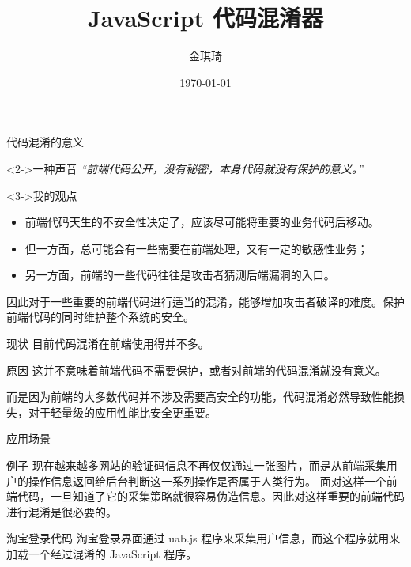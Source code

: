 \documentclass[presentation]{beamer}
\author{金琪琦}
\date{\today}
\title{JavaScript 代码混淆器}
\begin{document}
\maketitle

\begin{frame}[label=sec-1]{代码混淆的意义}
\begin{block}<2->{一种声音}
\emph{“前端代码公开，没有秘密，本身代码就没有保护的意义。”}
\end{block}
\begin{block}<3->{我的观点}
\begin{itemize}
\item 前端代码天生的不安全性决定了，应该尽可能将重要的业务代码后移动。
\item 但一方面，总可能会有一些需要在前端处理，又有一定的敏感性业务；
\item 另一方面，前端的一些代码往往是攻击者猜测后端漏洞的入口。
\end{itemize}

因此对于一些重要的前端代码进行适当的混淆，能够增加攻击者破译的难度。保护前端代码的同时维护整个系统的安全。
\end{block}
\end{frame}
\begin{frame}[label=sec-2]{现状}
目前代码混淆在前端使用得并不多。
\begin{block}{原因}
这并不意味着前端代码不需要保护，或者对前端的代码混淆就没有意义。

而是因为前端的大多数代码并不涉及需要高安全的功能，代码混淆必然导致性能损失，对于轻量级的应用性能比安全更重要。
\end{block}
\end{frame}
\begin{frame}[label=sec-3]{应用场景}
\begin{block}{例子}
现在越来越多网站的验证码信息不再仅仅通过一张图片，而是从前端采集用户的操作信息返回给后台判断这一系列操作是否属于人类行为。
面对这样一个前端代码，一旦知道了它的采集策略就很容易伪造信息。因此对这样重要的前端代码进行混淆是很必要的。
\end{block}
\begin{block}{淘宝登录代码}
淘宝登录界面通过 uab.js 程序来采集用户信息，而这个程序就用来加载一个经过混淆的 JavaScript 程序。
\end{block}
\end{frame}
\end{document}
